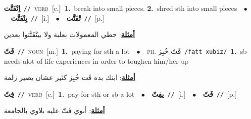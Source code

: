 \documentclass[10pt,a4paper,twoside]{article} %
\begin{document}
\begin{multicols}{2}
{{\setlength\topsep{0pt}\textbf{\foreignlanguage{arabic}{اِتْفَتَّت}}\ {\color{gray}\texttt{//}\color{black}}\ \textsc{verb}\ [c.]\ \textbf{1.}~break into small pieces.  \textbf{2.}~shred sth into small pieces\ \ $\bullet$\ \ \setlength\topsep{0pt}\textbf{\foreignlanguage{arabic}{يِتْفَتَّت}}\ {\color{gray}\texttt{//}\color{black}}\ [i.]\ \ $\bullet$\ \ \setlength\topsep{0pt}\textbf{\foreignlanguage{arabic}{تْفَتَّت}}\ {\color{gray}\texttt{//}\color{black}}\ [p.]\  \begin{flushright}\color{gray}\foreignlanguage{arabic}{\textbf{\underline{\foreignlanguage{arabic}{أمثلة}}}: حطي المعمولات بعلبة ولا بيتْفَتَّتوا بعدين}\end{flushright}\color{black}} \vspace{2mm}

{\setlength\topsep{0pt}\textbf{\foreignlanguage{arabic}{فَتّ}}\ {\color{gray}\texttt{//}\color{black}}\ \textsc{noun}\ [m.]\ \textbf{1.}~paying for sth a lot\ \ $\bullet$\ \ \textsc{ph.} \color{gray} \foreignlanguage{arabic}{فَتّ خُبِز}\color{black}\ {\color{gray}\texttt{/{\sffamily fatt xubiz}/}\color{black}}\ \textbf{1.}~sb needs alot of life experiences in order to toughen him/her up\  \begin{flushright}\color{gray}\foreignlanguage{arabic}{\textbf{\underline{\foreignlanguage{arabic}{أمثلة}}}: ابنك بده فَت خُبِز كثير عشان يصير زلمة}\end{flushright}\color{black}} \vspace{2mm}

{\setlength\topsep{0pt}\textbf{\foreignlanguage{arabic}{فِتّ}}\ {\color{gray}\texttt{//}\color{black}}\ \textsc{verb}\ [c.]\ \textbf{1.}~pay for sth or sb a lot\ \ $\bullet$\ \ \setlength\topsep{0pt}\textbf{\foreignlanguage{arabic}{يفِتّ}}\ {\color{gray}\texttt{//}\color{black}}\ [i.]\ \ $\bullet$\ \ \setlength\topsep{0pt}\textbf{\foreignlanguage{arabic}{فَتّ}}\ {\color{gray}\texttt{//}\color{black}}\ [p.]\  \begin{flushright}\color{gray}\foreignlanguage{arabic}{\textbf{\underline{\foreignlanguage{arabic}{أمثلة}}}: أبوي فَتّ عليه بلاوي بالجامعة}\end{flushright}\color{black}} \vspace{2mm}

}
\end{multicols}
\end{document}

